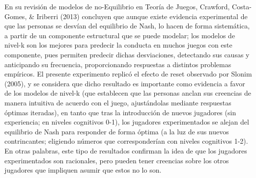 En su revisión de modelos de no-Equilibrio en Teoría de Juegos, Crawford, Costa-Gomes, & Iriberri (2013) concluyen que aunque existe evidencia experimental de que las personas se desvían del equilibrio de Nash, lo hacen de forma sistemática, a partir de un componente estructural que se puede modelar; los modelos de nivel-k son los mejores para predecir la conducta en muchos juegos con este componente, pues permiten predecir dichas desviaciones, detectando sus causas y anticipando su frecuencia, proporcionando respuestas a distintos problemas empíricos. El presente experimento replicó el efecto de reset observado por Slonim (2005), y se  considera que dicho resultado es importante como evidencia a favor de los modelos de nivel-k (que establecen que las personas anclan sus creencias de manera intuitiva de acuerdo con el juego, ajustándolas mediante respuestas óptimas iteradas), en tanto que tras la introducción de nuevos jugadores (sin experiencia; en niveles cognitivos 0-1), los jugadores experimentados se alejan del equilibrio de Nash para responder de forma óptima (a la luz de sus nuevos contrincantes; eligiendo números que corresponderían con niveles cognitivos 1-2). En otras palabras, este tipo de resultados confirman la idea de que los jugadores experimentados son racionales, pero pueden tener  creencias sobre los otros jugadores que impliquen asumir que estos no lo son.\\
